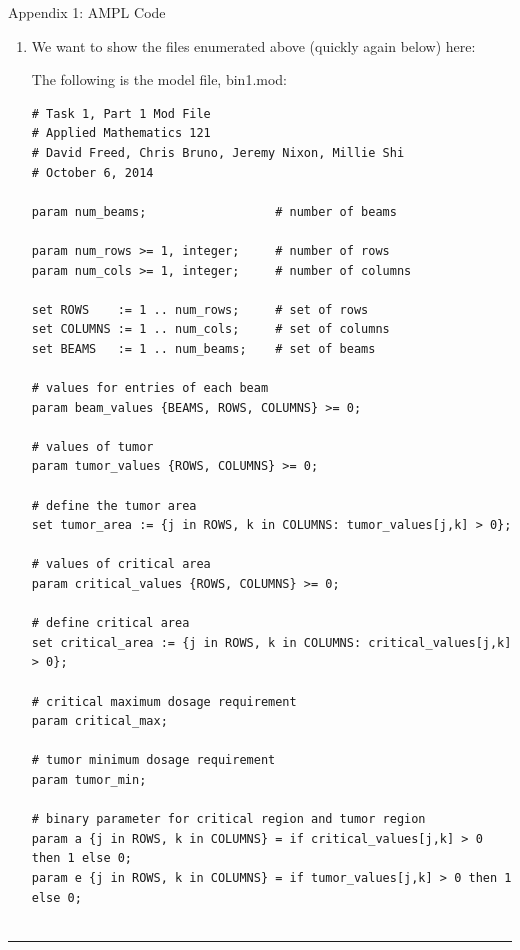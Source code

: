 \documentclass[12pt]{article}
\makeatletter
\newenvironment{task}{\@startsection
       {section}{1}
       {0.4em}{-.5ex plus -1ex minus -.2ex}{.5ex plus .2ex}
       {\pagebreak[3]\large\bf\noindent{Task}}}
       {\nopagebreak[3]\vspace{3ex}\begin{center}\rule{1\linewidth}{.3pt}\end{center}}
\makeatother
\begin{document}

\begin{task}{Appendix 1: AMPL Code}
\begin{enumerate}
\item We want to show the files enumerated above (quickly again below) here:


The following is the model file, bin1.mod:
\begin{lstlisting}
# Task 1, Part 1 Mod File
# Applied Mathematics 121
# David Freed, Chris Bruno, Jeremy Nixon, Millie Shi
# October 6, 2014

param num_beams;                  # number of beams

param num_rows >= 1, integer;     # number of rows
param num_cols >= 1, integer;     # number of columns 

set ROWS    := 1 .. num_rows;	  # set of rows
set COLUMNS := 1 .. num_cols;	  # set of columns
set BEAMS   := 1 .. num_beams;    # set of beams

# values for entries of each beam
param beam_values {BEAMS, ROWS, COLUMNS} >= 0; 

# values of tumor
param tumor_values {ROWS, COLUMNS} >= 0; 

# define the tumor area 
set tumor_area := {j in ROWS, k in COLUMNS: tumor_values[j,k] > 0};

# values of critical area
param critical_values {ROWS, COLUMNS} >= 0; 

# define critical area 
set critical_area := {j in ROWS, k in COLUMNS: critical_values[j,k] > 0};

# critical maximum dosage requirement
param critical_max;

# tumor minimum dosage requirement
param tumor_min;

# binary parameter for critical region and tumor region
param a {j in ROWS, k in COLUMNS} = if critical_values[j,k] > 0 then 1 else 0;
param e {j in ROWS, k in COLUMNS} = if tumor_values[j,k] > 0 then 1 else 0;


\end{lstlisting}
\end{enumerate}
\end{task}
\end{document}
